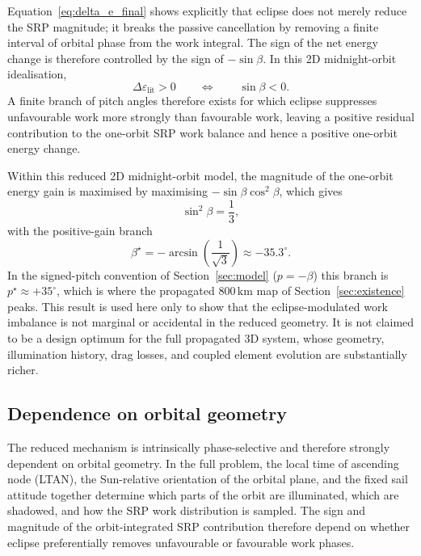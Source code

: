 \vspace{0.5em}
\par\noindent Equation~\eqref{eq:delta_e_final} shows explicitly that eclipse does not merely reduce the SRP magnitude; it breaks the passive cancellation by removing a finite interval of orbital phase from the work integral. The sign of the net energy change is therefore controlled by the sign of \(-\sin\beta\). In this 2D midnight-orbit idealisation,
\begin{equation}
\Delta\varepsilon_{\text{lit}} > 0
\qquad\Longleftrightarrow\qquad
\sin\beta < 0.
\end{equation}
A finite branch of pitch angles therefore exists for which eclipse suppresses unfavourable work more strongly than favourable work, leaving a positive residual contribution to the one-orbit SRP work balance and hence a positive one-orbit energy change.

\vspace{0.5em}
\par\noindent Within this reduced 2D midnight-orbit model, the magnitude of the one-orbit energy gain is maximised by maximising \(-\sin\beta\cos^2\beta\), which gives
\begin{equation}
\sin^2\beta = \frac{1}{3},
\end{equation}
with the positive-gain branch
\begin{equation}
\beta^\star = -\arcsin\left(\frac{1}{\sqrt{3}}\right)\approx -35.3^\circ.
\end{equation}
In the signed-pitch convention of Section~\ref{sec:model} (\(p = -\beta\)) this branch is \(p^\star \approx +35^\circ\), which is where the propagated \(800\,\mathrm{km}\) map of Section~\ref{sec:existence} peaks. This result is used here only to show that the eclipse-modulated work imbalance is not marginal or accidental in the reduced geometry. It is not claimed to be a design optimum for the full propagated 3D system, whose geometry, illumination history, drag losses, and coupled element evolution are substantially richer.



\vspace{0.5em}
\subsection{\textbf{Dependence on orbital geometry}}

\noindent The reduced mechanism is intrinsically phase-selective and therefore strongly dependent on orbital geometry. In the full problem, the local time of ascending node (LTAN), the Sun-relative orientation of the orbital plane, and the fixed sail attitude together determine which parts of the orbit are illuminated, which are shadowed, and how the SRP work distribution is sampled. The sign and magnitude of the orbit-integrated SRP contribution therefore depend on whether eclipse preferentially removes unfavourable or favourable work phases.

